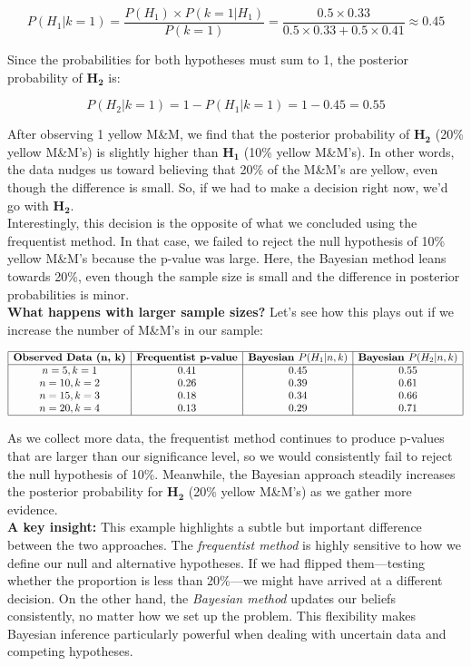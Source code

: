 \[
P(H_1 | k = 1) = \frac{P(H_1) \times P(k = 1 | H_1)}{P(k = 1)} = \frac{0.5 \times 0.33}{0.5 \times 0.33 + 0.5 \times 0.41} \approx 0.45
\]

Since the probabilities for both hypotheses must sum to 1, the posterior probability of \(\mathbf{H_2}\) is:

\[
P(H_2 | k = 1) = 1 - P(H_1 | k = 1) = 1 - 0.45 = 0.55
\]

After observing 1 yellow M\&M, we find that the posterior probability of \(\mathbf{H_2}\) (20\% yellow M\&M’s) is slightly higher than \(\mathbf{H_1}\) (10\% yellow M\&M’s). In other words, the data nudges us toward believing that 20\% of the M\&M’s are yellow, even though the difference is small. So, if we had to make a decision right now, we’d go with \(\mathbf{H_2}\).\\

Interestingly, this decision is the opposite of what we concluded using the frequentist method. In that case, we failed to reject the null hypothesis of 10\% yellow M\&M’s because the p-value was large. Here, the Bayesian method leans towards 20\%, even though the sample size is small and the difference in posterior probabilities is minor.\\

\textbf{What happens with larger sample sizes?} Let’s see how this plays out if we increase the number of M\&M’s in our sample:

\[
\begin{array}{|c|c|c|c|}
\hline
\textbf{Observed Data (n, k)} & \textbf{Frequentist p-value} & \textbf{Bayesian } P(H_1 | n, k) & \textbf{Bayesian } P(H_2 | n, k) \\
\hline
n = 5, k = 1 & 0.41 & 0.45 & 0.55 \\
n = 10, k = 2 & 0.26 & 0.39 & 0.61 \\
n = 15, k = 3 & 0.18 & 0.34 & 0.66 \\
n = 20, k = 4 & 0.13 & 0.29 & 0.71 \\
\hline
\end{array}
\]

As we collect more data, the frequentist method continues to produce p-values that are larger than our significance level, so we would consistently fail to reject the null hypothesis of 10\%. Meanwhile, the Bayesian approach steadily increases the posterior probability for \(\mathbf{H_2}\) (20\% yellow M\&M’s) as we gather more evidence.\\

\textbf{A key insight:} This example highlights a subtle but important difference between the two approaches. The \textit{frequentist method} is highly sensitive to how we define our null and alternative hypotheses. If we had flipped them—testing whether the proportion is less than 20\%—we might have arrived at a different decision. On the other hand, the \textit{Bayesian method} updates our beliefs consistently, no matter how we set up the problem. This flexibility makes Bayesian inference particularly powerful when dealing with uncertain data and competing hypotheses.



